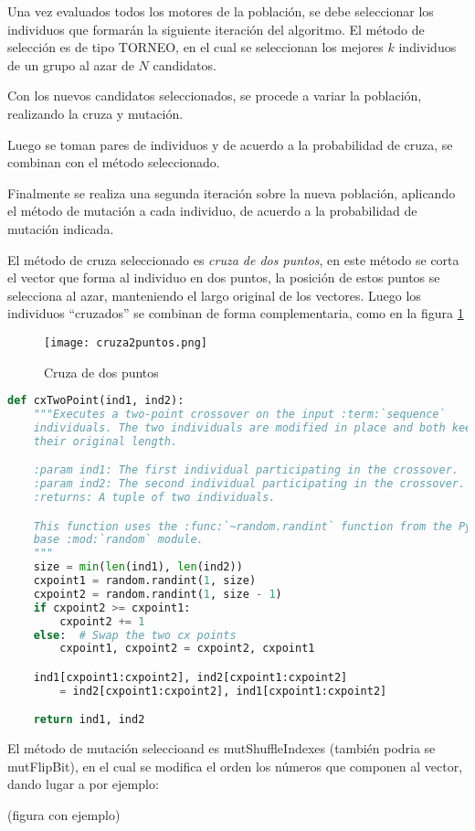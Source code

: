Una vez evaluados todos los motores de la población, se debe seleccionar los
individuos que formarán la siguiente iteración del algoritmo.
%
El método de selección es de tipo TORNEO, en el cual se seleccionan los mejores
$k$ individuos de un grupo al azar de $N$ candidatos.
%

Con los nuevos candidatos seleccionados, se procede a variar la población,
realizando la cruza y mutación.

Luego se toman pares de individuos y de acuerdo a la probabilidad de cruza, se
combinan con el método seleccionado.

Finalmente se realiza una segunda iteración sobre la nueva población, aplicando
el método de mutación a cada individuo, de acuerdo a la probabilidad de
mutación indicada.


El método de cruza seleccionado es \emph{cruza de dos puntos}, en este método
se corta el vector que forma al individuo en dos puntos, la posición de estos
puntos se selecciona al azar, manteniendo el largo original de los vectores.
%
Luego los individuos ``cruzados'' se combinan de forma complementaria, como en
la figura \ref{fig:cr2puntos}

\begin{figure}
  \centering
  \texttt{[image: cruza2puntos.png]}
  \caption{Cruza de dos puntos}
  \label{fig:cr2puntos}
\end{figure}


\begin{lstlisting}[language=Python]
def cxTwoPoint(ind1, ind2):
    """Executes a two-point crossover on the input :term:`sequence`
    individuals. The two individuals are modified in place and both keep
    their original length.

    :param ind1: The first individual participating in the crossover.
    :param ind2: The second individual participating in the crossover.
    :returns: A tuple of two individuals.

    This function uses the :func:`~random.randint` function from the Python
    base :mod:`random` module.
    """
    size = min(len(ind1), len(ind2))
    cxpoint1 = random.randint(1, size)
    cxpoint2 = random.randint(1, size - 1)
    if cxpoint2 >= cxpoint1:
        cxpoint2 += 1
    else:  # Swap the two cx points
        cxpoint1, cxpoint2 = cxpoint2, cxpoint1

    ind1[cxpoint1:cxpoint2], ind2[cxpoint1:cxpoint2]
        = ind2[cxpoint1:cxpoint2], ind1[cxpoint1:cxpoint2]

    return ind1, ind2
\end{lstlisting}


El método de mutación seleccioand es mutShuffleIndexes (también podria se
mutFlipBit), en el cual se modifica el orden los números que componen al vector, dando lugar a por ejemplo:

(figura con ejemplo)
